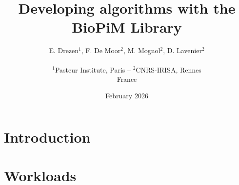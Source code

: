 \documentclass{article}
\title{Developing algorithms with the BioPiM Library}
\author{E. Drezen$^1$, F. De Moor$^2$, M. Mognol$^2$, D. Lavenier$^2$\\ 
~\\
$^1$Pasteur Institute, Paris -- $^2$CNRS-IRISA, Rennes\\
France}
\date{February 2026}
\begin{document}
\maketitle



\section{Introduction}




%

\section{Workloads}

















\newpage


\end{document}
